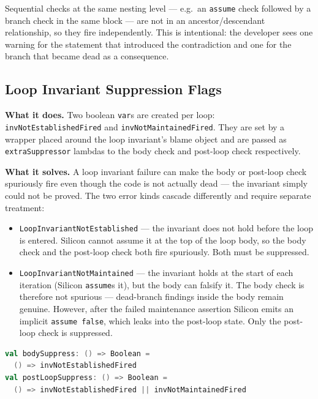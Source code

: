 \documentclass[9pt,a4paper,twocolumn]{article}
\begin{document}
Sequential checks at the same nesting level — e.g.\ an
\texttt{assume} check followed by a branch check in the same block
— are not in an ancestor/descendant relationship, so they fire
independently. This is intentional: the developer sees one warning
for the statement that introduced the contradiction and one for
the branch that became dead as a consequence.

\subsection{Loop Invariant Suppression Flags}
\label{sec:inv-flags}

\textbf{What it does.} Two boolean \texttt{var}s are created per
loop: \texttt{invNotEstablishedFired} and
\texttt{invNotMaintainedFired}. They are set by a wrapper placed
around the loop invariant's blame object and are passed as
\texttt{extraSuppressor} lambdas to the body check and post-loop
check respectively.

\textbf{What it solves.} A loop invariant failure can make the
body or post-loop check spuriously fire even though the code is
not actually dead — the invariant simply could not be proved. The
two error kinds cascade differently and require separate treatment:

\begin{itemize}
  \item \texttt{LoopInvariantNotEstablished} — the invariant does
    not hold before the loop is entered. Silicon cannot assume it
    at the top of the loop body, so the body check and the
    post-loop check both fire spuriously. Both must be suppressed.
  \item \texttt{LoopInvariantNotMaintained} — the invariant holds
    at the start of each iteration (Silicon \texttt{assume}s it),
    but the body can falsify it. The body check is therefore not
    spurious — dead-branch findings inside the body remain genuine.
    However, after the failed maintenance assertion Silicon emits
    an implicit \texttt{assume false}, which leaks into the
    post-loop state. Only the post-loop check is suppressed.
\end{itemize}

\begin{lstlisting}[language=Scala]
val bodySuppress: () => Boolean =
  () => invNotEstablishedFired
val postLoopSuppress: () => Boolean =
  () => invNotEstablishedFired || invNotMaintainedFired
\end{lstlisting}
\end{document}
